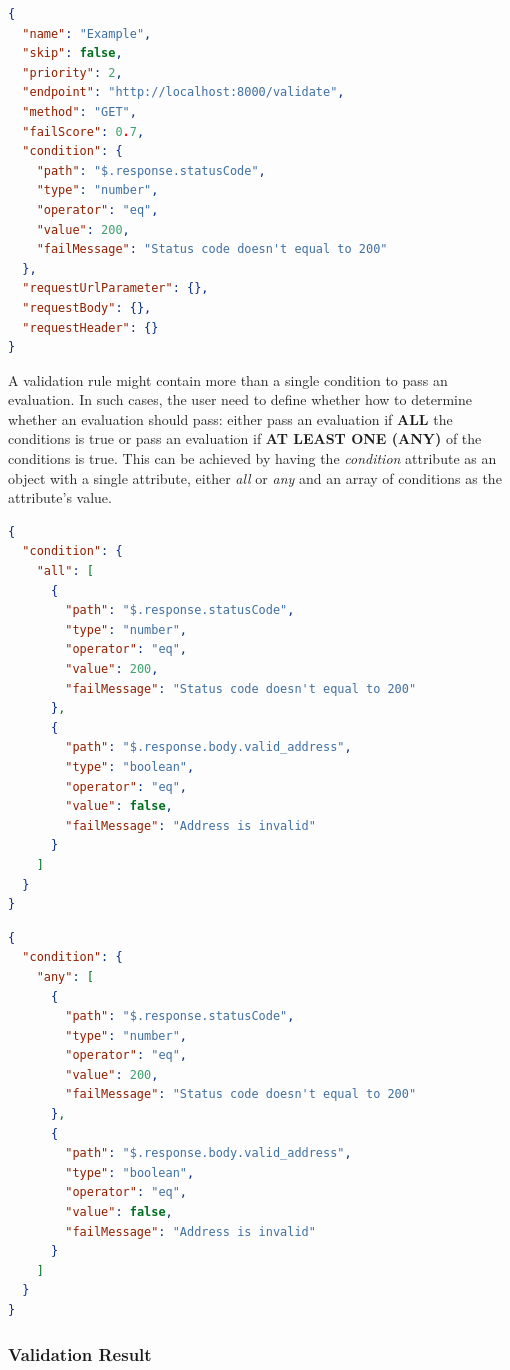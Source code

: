     \begin{lstlisting}[caption={Validation rule example (JSON)}, language=json]
{
  "name": "Example",
  "skip": false,
  "priority": 2,
  "endpoint": "http://localhost:8000/validate",
  "method": "GET",
  "failScore": 0.7,
  "condition": {
    "path": "$.response.statusCode",
    "type": "number",
    "operator": "eq",
    "value": 200,
    "failMessage": "Status code doesn't equal to 200"
  },
  "requestUrlParameter": {},
  "requestBody": {},
  "requestHeader": {}
}
    \end{lstlisting}

    A validation rule might contain more than a single condition to pass an evaluation. In such cases, the user need to define whether how to determine whether an evaluation should pass: either pass an evaluation if \textbf{ALL} the conditions is true or pass an evaluation if \textbf{AT LEAST ONE (ANY)} of the conditions is true. This can be achieved by having the \emph{condition} attribute as an object with a single attribute, either \emph{all} or \emph{any} and an array of conditions as the attribute's value.

    \begin{lstlisting}[caption={Validation rule \textbf{condition} attribute example with ALL condition (JSON)}, language=json]
{
  "condition": {
    "all": [
      {
        "path": "$.response.statusCode",
        "type": "number",
        "operator": "eq",
        "value": 200,
        "failMessage": "Status code doesn't equal to 200"
      },
      {
        "path": "$.response.body.valid_address",
        "type": "boolean",
        "operator": "eq",
        "value": false,
        "failMessage": "Address is invalid"
      }
    ]
  }
}
    \end{lstlisting}

    \begin{lstlisting}[caption={Validation rule \textbf{condition} attribute example with ANY condition (JSON)}, language=json]
{
  "condition": {
    "any": [
      {
        "path": "$.response.statusCode",
        "type": "number",
        "operator": "eq",
        "value": 200,
        "failMessage": "Status code doesn't equal to 200"
      },
      {
        "path": "$.response.body.valid_address",
        "type": "boolean",
        "operator": "eq",
        "value": false,
        "failMessage": "Address is invalid"
      }
    ]
  }
}
    \end{lstlisting}

  \subsubsection{Validation Result}

